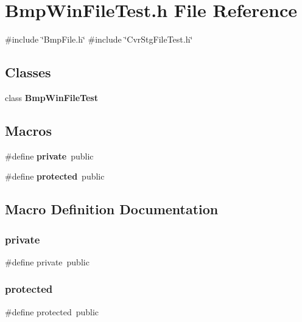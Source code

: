 \section{Bmp\+Win\+File\+Test.\+h File Reference}
\label{BmpWinFileTest_8h}
{\ttfamily \#include \char`\"{}Bmp\+File.\+h\char`\"{}}\newline
{\ttfamily \#include \char`\"{}Cvr\+Stg\+File\+Test.\+h\char`\"{}}\newline
\subsection*{Classes}
\begin{DoxyCompactItemize}
\item 
class \textbf{ Bmp\+Win\+File\+Test}
\end{DoxyCompactItemize}
\subsection*{Macros}
\begin{DoxyCompactItemize}
\item 
\#define \textbf{ private}~public
\item 
\#define \textbf{ protected}~public
\end{DoxyCompactItemize}


\subsection{Macro Definition Documentation}
\mbox{\label{BmpWinFileTest_8h_a6a1d6e1a12975a4e9a0b5b952e79eaad}} 
\subsubsection{private}
{\footnotesize\ttfamily \#define private~public}

\mbox{\label{BmpWinFileTest_8h_a363c8dcebb1777654ad1703136a14ec8}} 
\subsubsection{protected}
{\footnotesize\ttfamily \#define protected~public}

